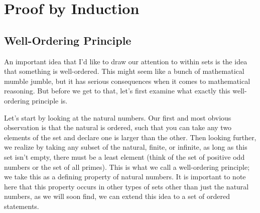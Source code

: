 \documentclass[11pt]{article}
\numberwithin{lemma}{section}
\numberwithin{equation}{section}
\numberwithin{define}{section}
\numberwithin{prop}{section}
\numberwithin{figure}{section}
\numberwithin{theorem}{section}
\newcounter{ex}[section]
\numberwithin{ex}{section}
\begin{document}
\section{Proof by Induction}
\subsection{Well-Ordering Principle}
An important idea that I'd like to draw our attention to within sets is the idea that something is well-ordered. This might seem like a bunch of mathematical mumble jumble, but it has serious consequences when it comes to mathematical reasoning. But before we get to that, let's first examine what exactly this well-ordering principle is. 

Let's start by looking at the natural numbers. Our first and most obvious observation is that the natural is ordered, such that you can take any two elements of the set and declare one is larger than the other. 
Then looking further, we realize by taking any subset of the natural, finite, or infinite, as long as this set isn't empty, there must be a least element (think of the set of positive odd numbers or the set of all primes). This is what we call a well-ordering principle; we take this as a defining property of natural numbers. 
It is important to note here that this property occurs in other types of sets other than just the natural numbers, as we will soon find, we can extend this idea to a set of ordered statements.
\end{document}
